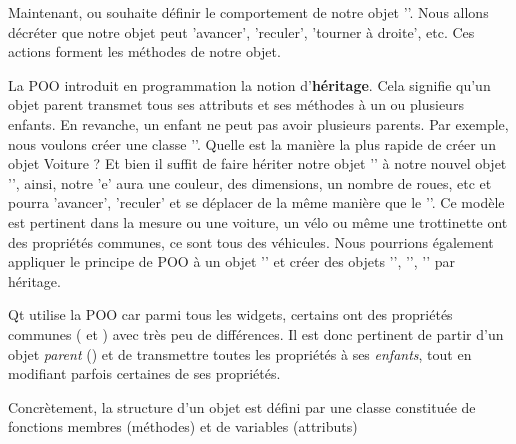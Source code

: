 \documentclass[12pt]{report}    %
\begin{document}
Maintenant, ou souhaite définir le comportement de notre objet ''. Nous allons décréter que notre objet peut 'avancer', 'reculer', 'tourner à droite', etc.
Ces actions forment les méthodes de notre objet.\newline \newline



La POO introduit en programmation la notion d'\textbf{héritage}. \newline
Cela signifie qu'un objet parent transmet tous ses attributs et ses méthodes à un ou plusieurs enfants. \newline
En revanche, un enfant ne peut pas avoir plusieurs parents. \newline \newline 
Par exemple, nous voulons créer une classe ''. Quelle est la manière la plus rapide de créer un objet Voiture ? Et bien il suffit de faire hériter notre objet '' à notre nouvel objet '', ainsi, notre 'e' aura une couleur, des dimensions, un nombre de roues, etc et pourra 'avancer', 'reculer' et se déplacer de la même manière que le ''. \newline Ce modèle est pertinent dans la mesure ou une voiture, un vélo ou même une trottinette ont des propriétés communes, ce sont tous des véhicules. \newline
Nous pourrions également appliquer le principe de POO à un objet '' et créer des objets '', '', '' par héritage. \newline




Qt utilise la POO car parmi tous les widgets, certains ont des propriétés communes ( et ) avec très peu de différences. Il est donc pertinent de partir d'un objet \textit{parent} () et de transmettre toutes les propriétés à ses \textit{enfants}, tout en modifiant parfois certaines de ses propriétés. \newline

Concrètement, la structure d'un objet est défini par une classe constituée de fonctions membres (méthodes) et de variables (attributs)
\end{document}
